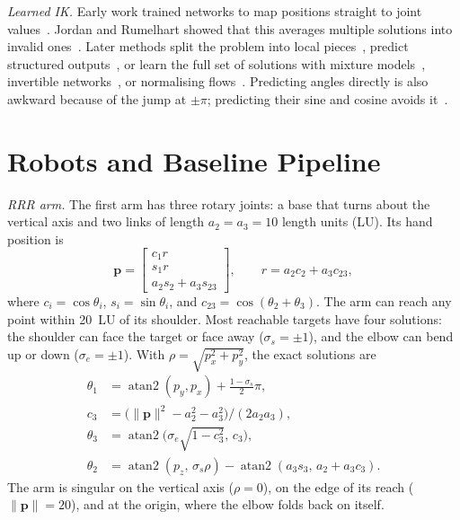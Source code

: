 \documentclass[conference]{IEEEtran}
\newcommand{\p}{\mathbf{p}}
\newcommand{\atantwo}{\operatorname{atan2}}
\begin{document}
\emph{Learned IK.} Early work trained networks to map positions straight to joint values~\cite{guez1988solution}. Jordan and Rumelhart showed that this averages multiple solutions into invalid ones~\cite{jordan1992forward}. Later methods split the problem into local pieces~\cite{dsouza2001learning,oyama2001modular,csiszar2017solving}, predict structured outputs~\cite{bocsi2011learning}, or learn the full set of solutions with mixture models~\cite{bishop1994mixture}, invertible networks~\cite{ardizzone2019analyzing}, or normalising flows~\cite{ames2022ikflow}. Predicting angles directly is also awkward because of the jump at $\pm\pi$; predicting their sine and cosine avoids it~\cite{zhou2019continuity}.

\section{Robots and Baseline Pipeline}
\label{sec:setup}

\emph{RRR arm.} The first arm has three rotary joints: a base that turns about the vertical axis and two links of length $a_2=a_3=10$ length units (LU). Its hand position is
\begin{equation}
\p=\begin{bmatrix} c_1 r \\ s_1 r \\ a_2 s_2 + a_3 s_{23}\end{bmatrix},\qquad r = a_2 c_2 + a_3 c_{23},
\label{eq:fk}
\end{equation}
where $c_i=\cos\theta_i$, $s_i=\sin\theta_i$, and $c_{23}=\cos(\theta_2+\theta_3)$. The arm can reach any point within 20~LU of its shoulder. Most reachable targets have four solutions: the shoulder can face the target or face away ($\sigma_s=\pm1$), and the elbow can bend up or down ($\sigma_e=\pm1$). With $\rho=\sqrt{p_x^2+p_y^2}$, the exact solutions are
\begin{equation}
\begin{aligned}
\theta_1 &= \atantwo(p_y,p_x) + \tfrac{1-\sigma_s}{2}\pi,\\
c_3 &= \big(\|\p\|^2-a_2^2-a_3^2\big)/(2a_2a_3),\\
\theta_3 &= \atantwo\big(\sigma_e\sqrt{1-c_3^2},\,c_3\big),\\
\theta_2 &= \atantwo(p_z,\,\sigma_s\rho) - \atantwo(a_3 s_3,\,a_2 + a_3 c_3).
\end{aligned}
\label{eq:ik}
\end{equation}
The arm is singular on the vertical axis ($\rho=0$), on the edge of its reach ($\|\p\|=20$), and at the origin, where the elbow folds back on itself.
\end{document}
